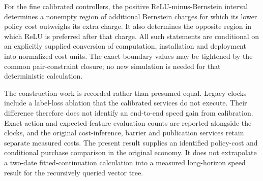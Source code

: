 For the fine calibrated controllers, the positive ReLU-minus-Bernstein interval determines a nonempty region of additional Bernstein charges for which its lower policy cost outweighs its extra charge. It also determines the opposite region in which ReLU is preferred after that charge. All such statements are conditional on an explicitly supplied conversion of computation, installation and deployment into normalized cost units. The exact boundary values may be tightened by the common pair-constraint closure; no new simulation is needed for that deterministic calculation.

The construction work is recorded rather than presumed equal. Legacy clocks include a label-loss ablation that the calibrated services do not execute. Their difference therefore does not identify an end-to-end speed gain from calibration. Exact action and expected-feature evaluation counts are reported alongside the clocks, and the original cost-inference, barrier and publication services retain separate measured costs. The present result supplies an identified policy-cost and conditional purchase comparison in the original economy. It does not extrapolate a two-date fitted-continuation calculation into a measured long-horizon speed result for the recursively queried vector tree.

